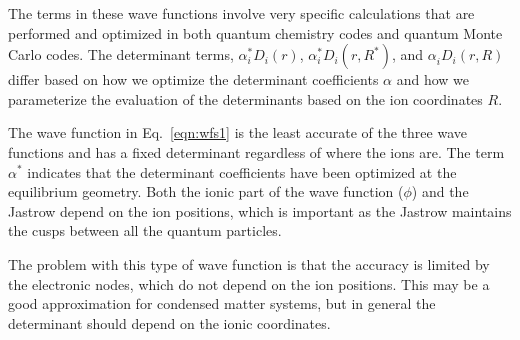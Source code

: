 \documentclass[aip,jcp,numerical,reprint]{revtex4-1}
\begin{document}
The terms in these wave functions involve very specific calculations that are performed and optimized in both quantum chemistry codes and quantum Monte Carlo codes.  
The determinant terms, $\alpha_{i}^{*}D_{i}(r) $, $\alpha_{i}^{*}D_{i}(r,R^{*}) $, and $\alpha_{i}^{}D_{i}(r,R)$ differ based on how we optimize the determinant coefficients $\alpha$ and how we parameterize the evaluation of the determinants based on the ion coordinates $R$.   

The  wave function in Eq.~\eqref{eqn:wfs1} is the least accurate of the three wave functions and has a fixed determinant regardless of where the ions are.  The term $\alpha^{*}$ indicates that the determinant coefficients have been optimized at the equilibrium geometry.  
Both the ionic part of the wave function ($\phi$) and the Jastrow depend on the ion positions, which is important as the Jastrow maintains the cusps between all the quantum particles.  

The problem with this type of wave function is that the accuracy is limited by the electronic nodes, which do not depend on the ion positions.
This may be a good approximation for condensed matter systems, but in general  the determinant should depend on the ionic coordinates. 
\end{document}
